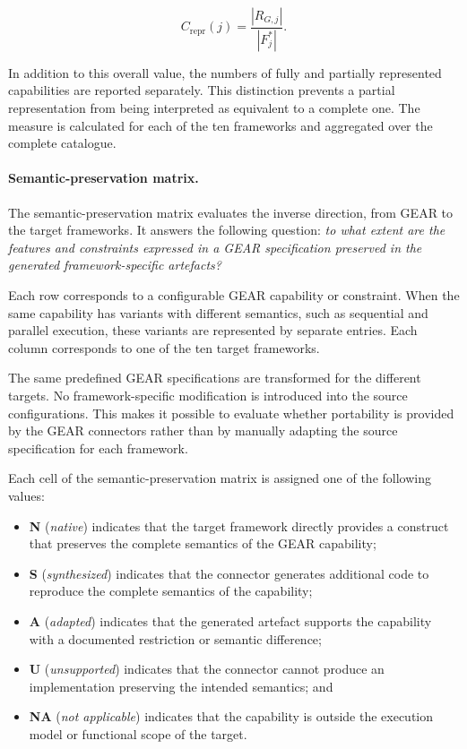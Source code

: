 \begin{equation}
    C_{\mathrm{repr}}(j)
    =
    \frac{|R_{G,j}|}{|F^{*}_{j}|}.
    \label{eq:representational-coverage}
\end{equation}

In addition to this overall value, the numbers of fully and partially
represented capabilities are reported separately. This distinction prevents
a partial representation from being interpreted as equivalent to a complete
one. The measure is calculated for each of the ten frameworks and aggregated
over the complete catalogue.

\paragraph{Semantic-preservation matrix.}

The semantic-preservation matrix evaluates the inverse direction, from GEAR
to the target frameworks. It answers the following question: \emph{to what
extent are the features and constraints expressed in a GEAR specification
preserved in the generated framework-specific artefacts?}

Each row corresponds to a configurable GEAR capability or constraint. When
the same capability has variants with different semantics, such as sequential
and parallel execution, these variants are represented by separate entries.
Each column corresponds to one of the ten target frameworks.

The same predefined GEAR specifications are transformed for the different
targets. No framework-specific modification is introduced into the source
configurations. This makes it possible to evaluate whether portability is
provided by the GEAR connectors rather than by manually adapting the source
specification for each framework.

Each cell of the semantic-preservation matrix is assigned one of the
following values:

\begin{itemize}
    \item \textbf{N} (\emph{native}) indicates that the target framework
    directly provides a construct that preserves the complete semantics of
    the GEAR capability;

    \item \textbf{S} (\emph{synthesized}) indicates that the connector
    generates additional code to reproduce the complete semantics of the
    capability;

    \item \textbf{A} (\emph{adapted}) indicates that the generated artefact
    supports the capability with a documented restriction or semantic
    difference;

    \item \textbf{U} (\emph{unsupported}) indicates that the connector cannot
    produce an implementation preserving the intended semantics; and

    \item \textbf{NA} (\emph{not applicable}) indicates that the capability
    is outside the execution model or functional scope of the target.
\end{itemize}

